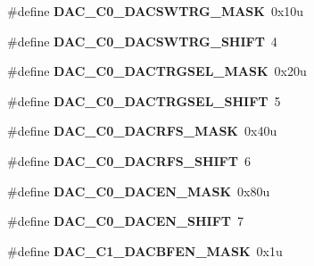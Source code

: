 \begin{DoxyCompactItemize}
\item 
\#define {\bfseries D\+A\+C\+\_\+\+C0\+\_\+\+D\+A\+C\+S\+W\+T\+R\+G\+\_\+\+M\+A\+SK}~0x10u\hypertarget{group__DAC__Register__Masks_ga7e785d90fec3c1817fc53fea41f41644}{}\label{group__DAC__Register__Masks_ga7e785d90fec3c1817fc53fea41f41644}

\item 
\#define {\bfseries D\+A\+C\+\_\+\+C0\+\_\+\+D\+A\+C\+S\+W\+T\+R\+G\+\_\+\+S\+H\+I\+FT}~4\hypertarget{group__DAC__Register__Masks_ga25e2afd71ee5cc41adde6f072c9d2604}{}\label{group__DAC__Register__Masks_ga25e2afd71ee5cc41adde6f072c9d2604}

\item 
\#define {\bfseries D\+A\+C\+\_\+\+C0\+\_\+\+D\+A\+C\+T\+R\+G\+S\+E\+L\+\_\+\+M\+A\+SK}~0x20u\hypertarget{group__DAC__Register__Masks_gac6dd81bc6500fc4b972c62bde339f31d}{}\label{group__DAC__Register__Masks_gac6dd81bc6500fc4b972c62bde339f31d}

\item 
\#define {\bfseries D\+A\+C\+\_\+\+C0\+\_\+\+D\+A\+C\+T\+R\+G\+S\+E\+L\+\_\+\+S\+H\+I\+FT}~5\hypertarget{group__DAC__Register__Masks_ga32f43711fa193364231213bd67c989f4}{}\label{group__DAC__Register__Masks_ga32f43711fa193364231213bd67c989f4}

\item 
\#define {\bfseries D\+A\+C\+\_\+\+C0\+\_\+\+D\+A\+C\+R\+F\+S\+\_\+\+M\+A\+SK}~0x40u\hypertarget{group__DAC__Register__Masks_gadc1973eafb50599b83de95422477a1f5}{}\label{group__DAC__Register__Masks_gadc1973eafb50599b83de95422477a1f5}

\item 
\#define {\bfseries D\+A\+C\+\_\+\+C0\+\_\+\+D\+A\+C\+R\+F\+S\+\_\+\+S\+H\+I\+FT}~6\hypertarget{group__DAC__Register__Masks_ga495d0702c9899844340d198120a77e33}{}\label{group__DAC__Register__Masks_ga495d0702c9899844340d198120a77e33}

\item 
\#define {\bfseries D\+A\+C\+\_\+\+C0\+\_\+\+D\+A\+C\+E\+N\+\_\+\+M\+A\+SK}~0x80u\hypertarget{group__DAC__Register__Masks_ga6865b52ae9a9275ef4db48eb3eb5d62a}{}\label{group__DAC__Register__Masks_ga6865b52ae9a9275ef4db48eb3eb5d62a}

\item 
\#define {\bfseries D\+A\+C\+\_\+\+C0\+\_\+\+D\+A\+C\+E\+N\+\_\+\+S\+H\+I\+FT}~7\hypertarget{group__DAC__Register__Masks_gae8835f0083d5a4e588402a32047e95cb}{}\label{group__DAC__Register__Masks_gae8835f0083d5a4e588402a32047e95cb}

\item 
\#define {\bfseries D\+A\+C\+\_\+\+C1\+\_\+\+D\+A\+C\+B\+F\+E\+N\+\_\+\+M\+A\+SK}~0x1u\hypertarget{group__DAC__Register__Masks_ga61aa82d21d0c84ff4fe42d0856c506bd}{}\label{group__DAC__Register__Masks_ga61aa82d21d0c84ff4fe42d0856c506bd}


\end{DoxyCompactItemize}
